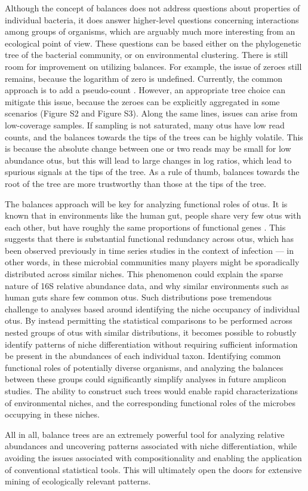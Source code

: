  Although the concept of balances does not address questions about properties of individual bacteria, it does answer higher-level questions concerning interactions among groups of organisms, which are arguably much more interesting from an ecological point of view. These questions can be based either on the phylogenetic tree of the bacterial community, or on environmental clustering.  There is still room for improvement on utilizing balances.  For example, the issue of zeroes still remains, because the logarithm of zero is undefined.  Currently, the common approach is to add a pseudo-count \cite{dealing_with_zeros}.  However, an appropriate tree choice can mitigate this issue, because the zeroes can be explicitly aggregated in some scenarios (Figure S2 and Figure S3).  Along the same lines, issues can arise from low-coverage samples.  If sampling is not saturated, many \gls{otu}s have low read counts, and the balances towards the tips of the trees can be highly volatile.  This is because the absolute change between one or two reads may be small for low abundance \gls{otu}s, but this will lead to large changes in log ratios, which lead to spurious signals at the tips of the tree.  As a rule of thumb, balances towards the root of the tree are more trustworthy than those at the tips of the tree.\par
 The balances approach will be key for analyzing functional roles of \gls{otu}s.  It is known that in environments like the human gut, people share very few \gls{otu}s with each other, but have roughly the same proportions of functional genes \cite{soil_pyro}.  This suggests that there is substantial functional redundancy across \gls{otu}s, which has been observed previously in time series studies in the context of infection \cite{microbiome_timeseries} — in other words, in these microbial communities many players might be sporadically distributed across similar niches.  This phenomenon could explain the sparse nature of 16S relative abundance data, and why similar environments such as human guts share few common \gls{otu}s.  Such distributions pose tremendous challenge to analyses based around identifying the niche occupancy of individual \gls{otu}s. By instead permitting the statistical comparisons to be performed across nested groups of \gls{otu}s with similar distributions, it becomes possible to robustly identify patterns of niche differentiation without requiring sufficient information be present in the abundances of each individual taxon. Identifying common functional roles of potentially diverse organisms, and analyzing the balances between these groups could significantly simplify analyses in future amplicon studies.  The ability to construct such trees would enable rapid characterizations of environmental niches, and the corresponding functional roles of the microbes occupying in these niches.\par
 All in all, balance trees are an extremely powerful tool for analyzing relative abundances and uncovering patterns associated with niche differentiation, while avoiding the issues associated with compositionality and enabling the application of conventional statistical tools.  This will ultimately open the doors for extensive mining of ecologically relevant patterns.
